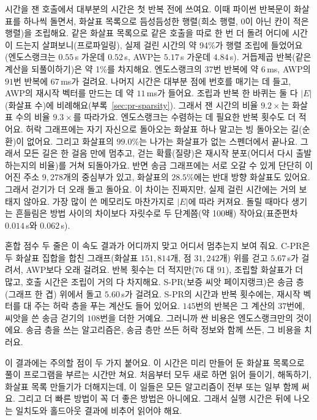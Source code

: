 시간을 잰 호출에서 대부분의 시간은 첫 반복 전에 쓰여요. 이때 파이썬 반복문이 화살표를 하나씩 돌면서, 화살표 목록으로 듬성듬성한 행렬(희소 행렬, 0이 아닌 칸이 적은 행렬)을 조립해요. 같은 화살표 목록으로 같은 호출을 따로 한 번 더 돌려 어디에 시간이 드는지 살펴보니(프로파일링), 실제 걸린 시간의 약 94\%가 행렬 조립에 들었어요(엔도스랭크는 $0.55$\,s 가운데 $0.52$\,s, AWP는 $5.17$\,s 가운데 $4.84$\,s). 거듭제곱 반복(같은 계산을 되풀이하기)은 약 1\%를 차지해요. 엔도스랭크의 $37$번 반복에 약 $6$\,ms, AWP의 $91$번 반복에 $67$\,ms가 걸려요. 나머지 시간은 대부분 점에 번호를 매기는 데 들고, AWP의 재시작 벡터를 만드는 데 약 $11$\,ms가 들어요. 조립과 반복 한 바퀴는 둘 다 $|E|$(화살표 수)에 비례해요(부록~\ref{sec:pr-sparsity}). 그래서 잰 시간의 비율 $9.2\times$는 화살표 수의 비율 $9.3\times$를 따라가요. 엔도스랭크는 수렴하는 데 필요한 반복 횟수도 더 적어요. 허락 그래프에는 자기 자신으로 돌아오는 화살표 하나 말고는 빙 돌아오는 길(순환)이 없어요. 그리고 화살표의 $99.0\%$는 나가는 화살표가 없는 스펜더에서 끝나요. 그래서 모든 길은 한 걸음 만에 멈추고, 걷는 확률(질량)은 재시작 분포(어디서 다시 출발하는지의 비율)를 거쳐 되돌아가요. 반면 송금 그래프에는 서로 오갈 수 있게 단단히 이어진 주소 $9{,}278$개의 중심부가 있고, 화살표의 $28.5\%$에는 반대 방향 화살표도 있어요. 그래서 걷기가 더 오래 돌고 돌아요. 이 차이는 진짜지만, 실제 걸린 시간에는 거의 보태지 않아요. 가장 많이 쓴 메모리도 마찬가지로 $|E|$에 따라 커져요. 돌릴 때마다 생기는 흔들림은 방법 사이의 차이보다 자릿수로 두 단계쯤(약 100배) 작아요(표준편차 $0.014$\,s와 $0.062$\,s).

혼합 점수 두 줄은 이 속도 결과가 어디까지 맞고 어디서 멈추는지 보여 줘요. C-PR은 두 화살표 집합을 합친 그래프(화살표 $151{,}814$개, 점 $31{,}242$개) 위를 걷고 $5.67$\,s가 걸려서, AWP보다 오래 걸려요. 반복 횟수는 더 적지만($76$ 대 $91$), 조립할 화살표가 더 많고, 호출 시간은 조립이 거의 다 차지해요. S-PR(보증 씨앗 페이지랭크)은 송금 층(그래프 한 겹) 위에서 돌고 $5.60$\,s가 걸려요. S-PR의 시간과 반복 횟수에는, 재시작 벡터를 대 주는 허락 층을 푸는 계산도 들어 있어요. $145$번의 반복은 그 계산의 $37$번에, 씨앗을 쓴 송금 걷기의 $108$번을 더한 거예요. 그러니까 싼 비용은 엔도스랭크만의 것이에요. 송금 층을 쓰는 알고리즘은, 송금 층만 쓰든 허락 정보와 함께 쓰든, 그 비용을 치러요.

이 결과에는 주의할 점이 두 가지 붙어요. 이 시간은 미리 만들어 둔 화살표 목록으로 풀이 프로그램을 부르는 시간만 쳐요. 처음부터 모두 새로 하면 읽어 들이기, 해독하기, 화살표 목록 만들기가 더해지는데, 이 일들은 모든 알고리즘이 전부 또는 일부 함께 써요. 그리고 더 빠른 방법이 꼭 더 좋은 방법은 아니에요. 그래서 실행 시간은 뒤에 나오는 일치도와 홀드아웃 결과에 비추어 읽어야 해요.

